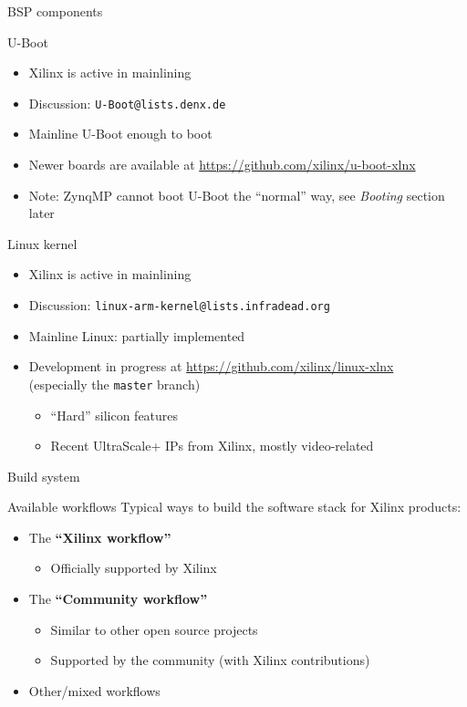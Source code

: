 \documentclass[xetex,table]{beamer}
\begin{document}
\begin{frame}[standout]
  BSP components
\end{frame}

\begin{frame}{U-Boot}
  \begin{itemize}
  \item Xilinx is active in mainlining
  \item Discussion: \texttt{U-Boot@lists.denx.de}
  \item Mainline U-Boot enough to boot
  \item Newer boards are available at
    \url{https://github.com/xilinx/u-boot-xlnx}
  \item Note: ZynqMP cannot boot U-Boot the ``normal'' way, see {\em
    Booting} section later
  \end{itemize}
\end{frame}

\begin{frame}{Linux kernel}
  \begin{itemize}
  \item Xilinx is active in mainlining
  \item Discussion: \texttt{linux-arm-kernel@lists.infradead.org}
  \item Mainline Linux: partially implemented
  \item Development in progress at
    \url{https://github.com/xilinx/linux-xlnx}\\
    (especially the \texttt{master} branch)
    \begin{itemize}
      \item ``Hard'' silicon features
      \item Recent UltraScale+ IPs from Xilinx, mostly video-related
    \end{itemize}
  \end{itemize}
\end{frame}

\begin{frame}[standout]
  Build system
\end{frame}

\begin{frame}{Available workflows}
  Typical ways to build the software stack for Xilinx products:
  \begin{itemize}
  \item The {\bf ``Xilinx workflow''}
    \begin{itemize}
    \item Officially supported by Xilinx
    \end{itemize}
  \item The {\bf ``Community workflow''}
    \begin{itemize}
    \item Similar to other open source projects
    \item Supported by the community (with Xilinx contributions)
    \end{itemize}
  \item Other/mixed workflows
  \end{itemize}
\end{frame}
\end{document}
